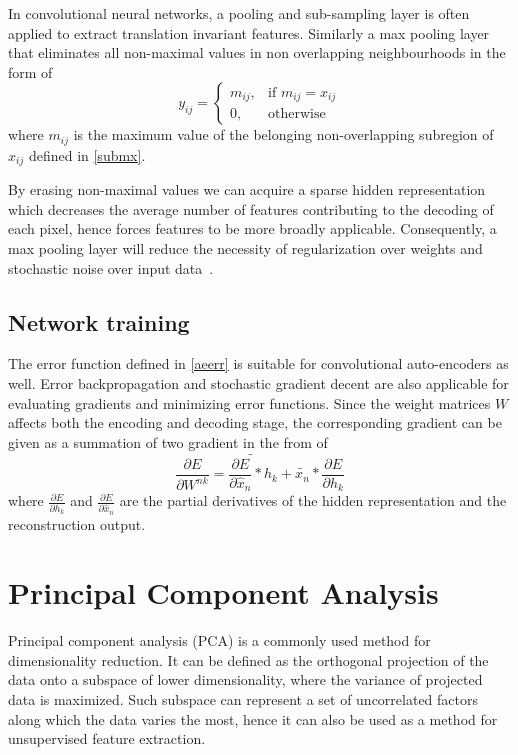 In convolutional neural networks, a pooling and sub-sampling layer is often applied to extract translation invariant features. Similarly a max pooling layer that eliminates all non-maximal values in non overlapping neighbourhoods in the form of
\begin{equation}
    y_{ij} = 
	\begin{cases}
    		m_{ij},& \text{if } m_{ij} = x_{ij}\\
    		0,              & \text{otherwise}
	\end{cases}
\end{equation}
where $m_{ij}$ is the maximum value of the belonging non-overlapping subregion of $x_{ij}$ defined in \ref{submx}.

By erasing non-maximal values we can acquire a sparse hidden representation which decreases the average number of features contributing to the decoding of each pixel, hence forces features to be more broadly applicable. Consequently, a max pooling layer will reduce the necessity of regularization over weights and stochastic noise over input data~\cite{masci2011stacked}.

\subsection{Network training}
\label{CAE training}
The error function defined in \ref{aeerr} is suitable for convolutional auto-encoders as well. Error backpropagation and stochastic gradient decent are also applicable for evaluating gradients and minimizing error functions. Since the weight matrices $W$ affects both the encoding and decoding stage, the corresponding gradient can be given as a summation of two gradient in the from of
\begin{equation}
\label{caeeq}
	\frac{\partial E}{\partial W^{nk}} = \widetilde{\frac{\partial E}{\partial \hat{x}_n}\ast h_k} +  \tilde{x_n}\ast\frac{\partial E}{\partial h_k}
\end{equation}
where $\frac{\partial E}{\partial h_k}$ and $\frac{\partial E}{\partial \hat{x}_n}$ are the partial derivatives of the hidden representation and the reconstruction output.


\section{Principal Component Analysis}
\label{sec:Principal Component Analysis}
Principal component analysis (PCA) is a commonly used method for dimensionality reduction. It can be defined as the orthogonal projection of the data onto a subspace of lower dimensionality, where the variance of projected data is maximized. Such subspace can represent a set of uncorrelated factors along which the data varies the most, hence it can also be used as a method for unsupervised feature extraction. 

